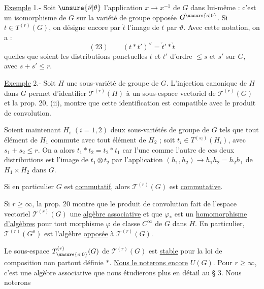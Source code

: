 
\uline{Exemple} 1.- Soit $\unsure{\vartheta|\theta}$ l'application $x\longrightarrow x^{-1}$ de $G$ dans lui-même : c'est un isomorphisme de $G$ sur la variété de groupe opposée $G^{\unsure{o|0}}$. Si $t\in T^{(r)}(G)$, on désigne encore par $\check t$ l'image de $t$ par $\vartheta$. Avec cette notation, on a :
\[
(23)\qquad (t*t')^\vee=\check t'*\check t
\]
quelles que soient les distributions ponctuelles $t$ et $t'$ d'ordre $\leq s$ et $s'$ sur $G$, avec $s+s'\leq r$.

\uline{Exemple} 2.- Soit $H$ une sous-variété de groupe de $G$. L'injection canonique de $H$ dans $G$ permet d'identifier $\mathcal T^{(r)}(H)$ à un sous-espace vectoriel de $\mathcal T^{(r)}(G)$ et la prop. 20, (ii), montre que cette identification est compatible avec le produit de convolution.

Soient maintenant $H_i$ $(i=1,2)$ deux sous-variétés de groupe de $G$ tels que tout élément de $H_1$ commute avec tout élément de $H_2$ ; soit $t_i\in T^{(s_i)}(H_i)$, avec $s_1+s_2\leq r$. On a alors $t_1*t_2=t_2*t_1$ car l'une comme l'autre de ces deux distributions est l'image de $t_1\otimes t_2$ par l'application $(h_1,h_2)\longrightarrow h_1h_2=h_2h_1$ de $H_1\times H_2$ dans $G$.

Si en particulier $G$ est \uline{commutatif}, alors $\mathcal T^{(r)}(G)$ est \uline{commutative}.

Si $r\geq\infty$, la prop. 20 montre que le produit de convolution fait de l'espace vectoriel $\mathcal T^{(r)}(G)$ une \uline{algèbre associative} et que $\varphi_*$ est un \uline{homomorphisme d'algèbres} pour tout morphisme $\varphi$ de classe $C^\infty$ de $G$ dans $H$. En particulier, $\mathcal T^{(r)}(G^o)$ est l'algèbre \uline{opposée} à $\mathcal T^{(r)}(G)$.

Le sous-espace $T_{\unsure{o|0}}^{(r)}(G)$ de $\mathcal T^{(r)}(G)$ est \uline{stable} pour la loi de composition non partout définie $*$. \uline{Nous le noterons encore} $U(G)$. Pour $r\geq\infty$, c'est une algèbre associative que nous étudierons plus en détail au § 3. Nous noterons
